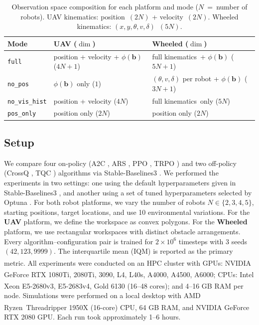 \documentclass{article}
\begin{document}
\begin{table}[tbp]
\centering
\footnotesize
\caption{\small Observation space composition for each platform and mode ($N$~=~number of robots). UAV kinematics: position~$(2N)$ + velocity~$(2N)$. Wheeled kinematics: $(x,y,\theta,v,\delta)$~$(5N)$.}
\label{tab:obs_modes}
\begin{tabular}{l|ll}
    \toprule
    \textbf{Mode} & \textbf{UAV ($\dim$)} & \textbf{Wheeled ($\dim$)} \\
    \midrule
    \texttt{full}        & position + velocity + $\phi(\mathbf{b})$ ($4N+1$) & full kinematics\ + $\phi(\mathbf{b})$ ($5N+1$) \\
    \texttt{no\_pos}     & $\phi(\mathbf{b})$ only ($1$) & $(\theta,v,\delta)$ per robot + $\phi(\mathbf{b})$ ($3N+1$) \\
    \texttt{no\_vis\_hist} & position + velocity ($4N$) & full kinematics\ only ($5N$) \\
    \texttt{pos\_only}   & position only ($2N$) & position only ($2N$) \\
    \bottomrule
\end{tabular}
\vspace{-6pt}
\end{table}

\subsection{Setup}
\label{sec:exp:setup}

We compare four on-policy (A2C \citep{mnih2016a2c}, ARS \citep{mania2018ars}, PPO \citep{schulman2017ppo}, TRPO \citep{schulman2015trust}) and two off-policy (CrossQ \citep{bhatt2024crossq}, TQC \citep{kuznetsov2020tqc}) algorithms via Stable-Baselines3 \citep{stable-baselines3}. We performed the experiments in two settings: one using the default hyperparameters given in Stable-Baselines3 \citep{stable-baselines3}, and another using a set of tuned hyperparameters selected by Optuna \cite{optuna_2019}. For both robot platforms, we vary the number of robots $N \in \{2, 3, 4, 5\}$, starting positions, target locations, and use 10 environmental variations. For the \textbf{UAV} platform, we define the workspace as convex polygons. For the \textbf{Wheeled} platform, we use rectangular workspaces with distinct obstacle arrangements. Every algorithm--configuration pair is trained for $2 \times 10^6$ timesteps with 3 seeds $(42, 123, 9999)$. The interquartile mean (IQM) \citep{agarwal2021deep} is reported as the primary metric. All experiments were conducted on an HPC cluster with GPUs: NVIDIA\textsuperscript{\textregistered} GeForce RTX 1080Ti, 2080Ti, 3090, L4, L40s, A4000, A4500, A6000; CPUs: Intel\textsuperscript{\textregistered} Xeon\textsuperscript{\textregistered} E5-2680v3, E5-2683v4, Gold 6130 (16--48 cores); and 4--16 GB RAM per node. Simulations were performed on a local desktop with AMD Ryzen\texttrademark\ Threadripper 1950X (16-core) CPU, 64 GB RAM, and NVIDIA\textsuperscript{\textregistered} GeForce RTX 2080 GPU. Each run took approximately 1--6 hours.
\end{document}
